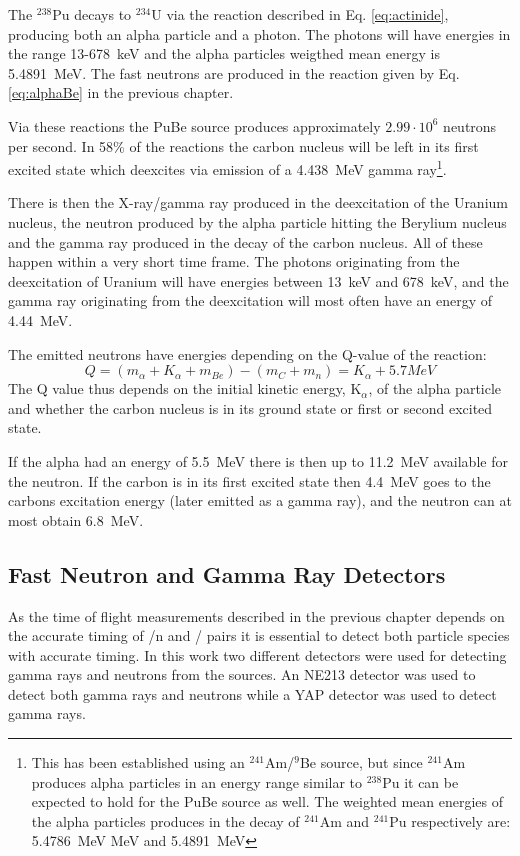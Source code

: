 \documentclass[main.tex]{subfiles}
\begin{document}
The $^\textrm{238}$Pu decays to $^\textrm{234}$U via the reaction described in Eq. \ref{eq:actinide}, producing both an alpha particle and a photon. The photons will have energies in the range 13-\SI{678}{\keV}\cite{Nudat} and the alpha particles weigthed mean energy is \SI{5.4891}{\mega\eV}\cite{Scherzinger:2017}. The fast neutrons are produced in the reaction given by Eq. \ref{eq:alphaBe} in the previous chapter.

Via these reactions the PuBe source produces approximately $\text{2.99}\cdot\text{10}^\text{6}$ neutrons per second\cite{Scherzinger:2017}. In 58\% of the reactions the carbon nucleus will be left in its first excited state which deexcites via emission of a \SI{4.438}{\mega\eV} gamma ray\cite{Scherzinger:2015}\footnote{This has been established using an $^\text{241}$Am/$^\text{9}$Be source, but since $^\text{241}$Am produces alpha particles in an energy range similar to $^\text{238}$Pu it can be expected to hold for the PuBe source as well. The weighted mean energies of the alpha particles produces in the decay of $^\text{241}$Am and $^\text{241}$Pu respectively are: \SI{5.4786}{\mega\eV} MeV and \SI{5.4891}{\mega\eV}\cite{Scherzinger:2017}}.

There is then the X-ray/gamma ray produced in the deexcitation of the Uranium nucleus, the neutron produced by the alpha particle hitting the Berylium nucleus and the gamma ray produced in the decay of the carbon nucleus. All of these happen within a very short time frame. The photons originating from the deexcitation of Uranium will have energies between \SI{13}{\keV} and \SI{678}{\keV}, and the gamma ray originating from the deexcitation will most often have an energy of \SI{4.44}{MeV}.

The emitted neutrons have energies depending on the Q-value of the reaction:
$$Q = (m_\alpha + K_\alpha + m_{Be}) - (m_{C} + m_n) = K_\alpha + 5.7 MeV$$
The Q value thus depends on the initial kinetic energy, K$_\alpha$, of the alpha particle and whether the carbon nucleus is in its ground state or first or second excited state. 

If the alpha had an energy of \SI{5.5}{\MeV} there is then up to \SI{11.2}{\MeV} available for the neutron. If the carbon is in its first excited state then \SI{4.4}{\MeV} goes to the carbons excitation energy (later emitted as a gamma ray), and the neutron can at most obtain \SI{6.8}{\MeV}. 



\subsection{Fast Neutron and Gamma Ray Detectors}
As the time of flight measurements described in the previous chapter depends on the accurate timing of \textgamma /n and \textgamma /\textgamma\; pairs it is essential to detect both particle species with accurate timing. In this work two different detectors were used for detecting gamma rays and neutrons from the sources. An NE213 detector was used to detect both gamma rays and neutrons while a YAP detector was used to detect gamma rays. 
\end{document}
